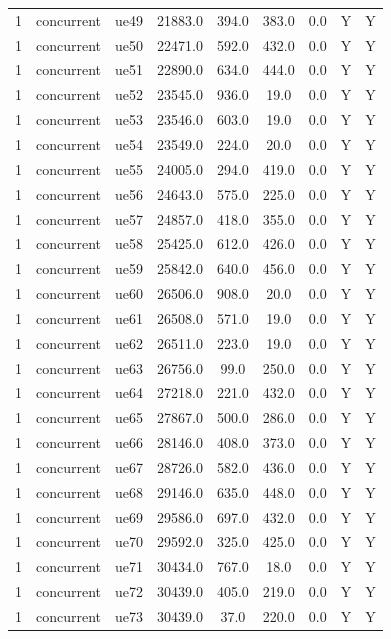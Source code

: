 \begin{table}[ht]
\begin{tabular}{|c|c|c|c|c|c|c|c|c|}
1 & concurrent & ue49 & 21883.0 & 394.0 & 383.0 & 0.0 & Y & Y \\
1 & concurrent & ue50 & 22471.0 & 592.0 & 432.0 & 0.0 & Y & Y \\
1 & concurrent & ue51 & 22890.0 & 634.0 & 444.0 & 0.0 & Y & Y \\
1 & concurrent & ue52 & 23545.0 & 936.0 & 19.0 & 0.0 & Y & Y \\
1 & concurrent & ue53 & 23546.0 & 603.0 & 19.0 & 0.0 & Y & Y \\
1 & concurrent & ue54 & 23549.0 & 224.0 & 20.0 & 0.0 & Y & Y \\
1 & concurrent & ue55 & 24005.0 & 294.0 & 419.0 & 0.0 & Y & Y \\
1 & concurrent & ue56 & 24643.0 & 575.0 & 225.0 & 0.0 & Y & Y \\
1 & concurrent & ue57 & 24857.0 & 418.0 & 355.0 & 0.0 & Y & Y \\
1 & concurrent & ue58 & 25425.0 & 612.0 & 426.0 & 0.0 & Y & Y \\
1 & concurrent & ue59 & 25842.0 & 640.0 & 456.0 & 0.0 & Y & Y \\
1 & concurrent & ue60 & 26506.0 & 908.0 & 20.0 & 0.0 & Y & Y \\
1 & concurrent & ue61 & 26508.0 & 571.0 & 19.0 & 0.0 & Y & Y \\
1 & concurrent & ue62 & 26511.0 & 223.0 & 19.0 & 0.0 & Y & Y \\
1 & concurrent & ue63 & 26756.0 & 99.0 & 250.0 & 0.0 & Y & Y \\
1 & concurrent & ue64 & 27218.0 & 221.0 & 432.0 & 0.0 & Y & Y \\
1 & concurrent & ue65 & 27867.0 & 500.0 & 286.0 & 0.0 & Y & Y \\
1 & concurrent & ue66 & 28146.0 & 408.0 & 373.0 & 0.0 & Y & Y \\
1 & concurrent & ue67 & 28726.0 & 582.0 & 436.0 & 0.0 & Y & Y \\
1 & concurrent & ue68 & 29146.0 & 635.0 & 448.0 & 0.0 & Y & Y \\
1 & concurrent & ue69 & 29586.0 & 697.0 & 432.0 & 0.0 & Y & Y \\
1 & concurrent & ue70 & 29592.0 & 325.0 & 425.0 & 0.0 & Y & Y \\
1 & concurrent & ue71 & 30434.0 & 767.0 & 18.0 & 0.0 & Y & Y \\
1 & concurrent & ue72 & 30439.0 & 405.0 & 219.0 & 0.0 & Y & Y \\
1 & concurrent & ue73 & 30439.0 & 37.0 & 220.0 & 0.0 & Y & Y \\

\end{tabular}
\end{table}
